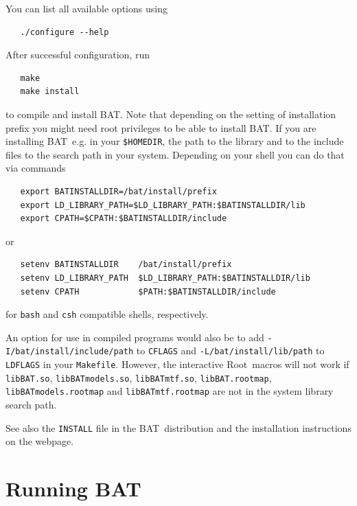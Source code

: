 \documentclass[11pt, a4paper]{article}
\newcommand{\bat}{{\sc BAT}}
\newcommand{\Root}{{\sc Root}}
\begin{document}
You can list all available options using
%
\begin{verbatim}
   ./configure --help
\end{verbatim}


After successful configuration, run
%
\begin{verbatim}
   make
   make install
\end{verbatim}
%
to compile and install \bat. Note that depending on the setting of
installation prefix you might need root privileges to be able to
install \bat. If you are installing \bat\ e.g. in your
\verb|$HOMEDIR|, %
the path to the library and to the include files to the search path in
your system. Depending on your shell you can do that via commands
%
\begin{verbatim}
   export BATINSTALLDIR=/bat/install/prefix
   export LD_LIBRARY_PATH=$LD_LIBRARY_PATH:$BATINSTALLDIR/lib
   export CPATH=$CPATH:$BATINSTALLDIR/include
\end{verbatim}
%
or
%
\begin{verbatim}
   setenv BATINSTALLDIR    /bat/install/prefix
   setenv LD_LIBRARY_PATH  $LD_LIBRARY_PATH:$BATINSTALLDIR/lib
   setenv CPATH            $PATH:$BATINSTALLDIR/include
\end{verbatim}
%
for \verb|bash| and \verb|csh| compatible shells, respectively.

An option for use in compiled programs would also be to add
\verb|-I/bat/install/include/path| to \verb|CFLAGS| and
\verb|-L/bat/install/lib/path| to \verb|LDFLAGS| in your
\verb|Makefile|. However, the interactive \Root\ macros will not work if
\verb|libBAT.so|, \verb|libBATmodels.so|, \verb|libBATmtf.so|,
\verb|libBAT.rootmap|, \verb|libBATmodels.rootmap| and
\verb|libBATmtf.rootmap| are not in the system library search path.

See also the \verb|INSTALL| file in the \bat\ distribution and the installation
instructions on the webpage.



\section{Running \bat}
\label{section:running}
\end{document}
